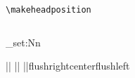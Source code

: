 \documentclass{beamer}
\begin{document}
\begin{frame}[fragile]{\texttt{\textbackslash makeheadposition}}
  \begin{columns}
    \begin{column}{0.6\textwidth}
      \begin{latexcode}
        \ExplSyntaxOn
        \dim_set:Nn \headwidth { \textwidth + \marginparsep + \marginparwidth }
        \ExplSyntaxOff

        |\linebreak|{\footruleskip}
        |\linebreak|{\color{RoyalPurple}}{\color{Dandelion}}
        |\linebreak|{flushright}{center}{flushleft}
      \end{latexcode}
    \end{column}


\end{columns}
\end{frame}
\end{document}

